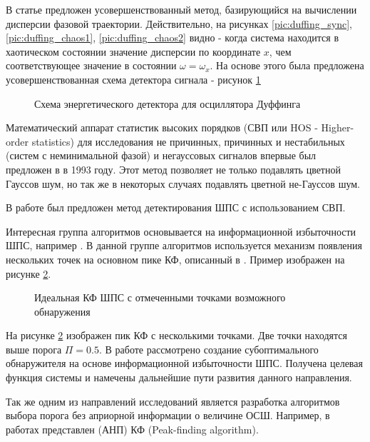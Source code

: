 В статье \cite{chaos_chen} предложен усовершенствованный метод, базирующийся на вычислении дисперсии
фазовой траектории. Действительно, на рисунках \ref{pic:duffing_sync}, \ref{pic:duffing_chaos1},
\ref{pic:duffing_chaos2} видно - когда система находится в хаотическом состоянии значение
дисперсии по координате ${x}$, чем соответствующее значение в состоянии $\omega = \omega_{x}$.
На основе этого была предложена усовершенствованная схема детектора сигнала - рисунок \ref{pic:chaos_energy_detector}
\begin{figure}[H]
	\center{}
	\caption{Схема энергетического детектора для осциллятора Дуффинга}
	\label{pic:chaos_energy_detector}
\end{figure}

Математический аппарат статистик высоких порядков (СВП или HOS - Higher-order statistics)
для исследования не причинных, причинных и нестабильных (систем с неминимальной фазой) и негауссовых сигналов впервые был предложен
в \cite{hos_petropulu} в 1993 году.  Этот метод позволяет не только подавлять цветной Гауссов шум, но так же в некоторых случаях подавлять
цветной не-Гауссов шум.

В работе \cite{hos_zhao} был предложен метод детектирования ШПС с использованием СВП.

Интересная группа алгоритмов основывается на информационной избыточности ШПС, например \cite{phd_che}. В данной
группе алгоритмов используется механизм появления нескольких точек на основном пике КФ, описанный в \cite{kaplan}. Пример
изображен на рисунке \ref{pic:sec1_peak_tcd}.
\begin{figure}[H]
        \center{}
        \caption{Идеальная КФ ШПС с отмеченными точками возможного обнаружения}
        \label{pic:sec1_peak_tcd}
\end{figure}
На рисунке \ref{pic:sec1_peak_tcd} изображен пик КФ с несколькими точками. Две точки находятся выше порога ${\Pi=0.5}$.
В работе \cite{phd_che} рассмотрено создание субоптимального обнаружителя на основе информационной избыточности ШПС.
Получена целевая функция системы и намечены дальнейшие пути развития данного направления.

Так же одним из направлений исследований является разработка алгоритмов выбора порога без априорной информации о величине ОСШ. Например,
в работах \cite{2max_ieee, 2max_article} представлен 
(АНП) КФ (Peak-finding algorithm).

